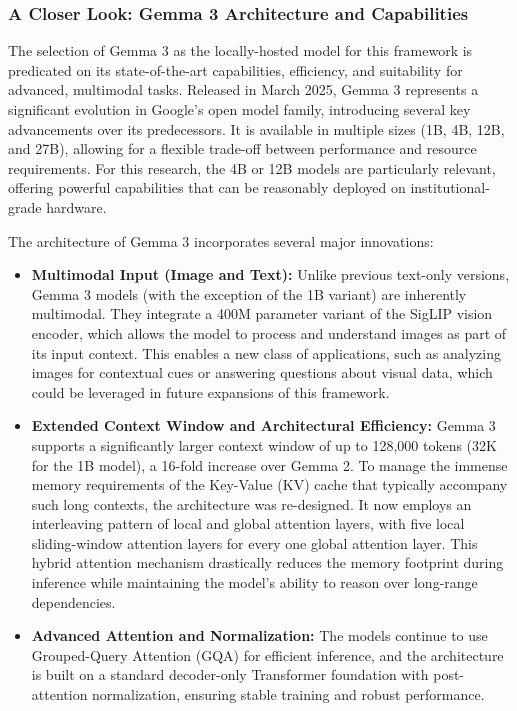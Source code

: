 \subsubsection{A Closer Look: Gemma 3 Architecture and Capabilities}

The selection of Gemma 3 as the locally-hosted model for this framework is predicated on its state-of-the-art capabilities, efficiency, and suitability for advanced, multimodal tasks. Released in March 2025, Gemma 3 represents a significant evolution in Google's open model family, introducing several key advancements over its predecessors. It is available in multiple sizes (1B, 4B, 12B, and 27B), allowing for a flexible trade-off between performance and resource requirements. For this research, the 4B or 12B models are particularly relevant, offering powerful capabilities that can be reasonably deployed on institutional-grade hardware.

The architecture of Gemma 3 incorporates several major innovations:

\begin{itemize}
    \item \textbf{Multimodal Input (Image and Text):} Unlike previous text-only versions, Gemma 3 models (with the exception of the 1B variant) are inherently multimodal. They integrate a 400M parameter variant of the SigLIP vision encoder, which allows the model to process and understand images as part of its input context. This enables a new class of applications, such as analyzing images for contextual cues or answering questions about visual data, which could be leveraged in future expansions of this framework.

    \item \textbf{Extended Context Window and Architectural Efficiency:} Gemma 3 supports a significantly larger context window of up to 128,000 tokens (32K for the 1B model), a 16-fold increase over Gemma 2. To manage the immense memory requirements of the Key-Value (KV) cache that typically accompany such long contexts, the architecture was re-designed. It now employs an interleaving pattern of local and global attention layers, with five local sliding-window attention layers for every one global attention layer. This hybrid attention mechanism drastically reduces the memory footprint during inference while maintaining the model's ability to reason over long-range dependencies.

    \item \textbf{Advanced Attention and Normalization:} The models continue to use Grouped-Query Attention (GQA) for efficient inference, and the architecture is built on a standard decoder-only Transformer foundation with post-attention normalization, ensuring stable training and robust performance.

\end{itemize}

